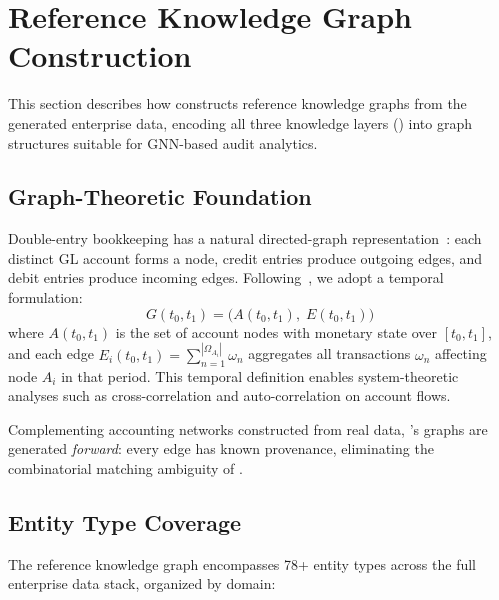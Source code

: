 \section{Reference Knowledge Graph Construction}
\label{sec:knowledge_graph}

This section describes how \system{} constructs reference knowledge
graphs from the generated enterprise data, encoding all three knowledge
layers () into graph structures suitable for
GNN-based audit analytics.

\subsection{Graph-Theoretic Foundation}
\label{sec:kg_foundation}

Double-entry bookkeeping has a natural directed-graph
representation~\citep{ijiri1965generalized}: each distinct GL account
forms a node, credit entries produce outgoing edges, and debit entries
produce incoming edges.  Following~\citet{ivertowski2024hardware}, we
adopt a temporal formulation:
\begin{equation}
G(t_0, t_1) = \bigl(A(t_0, t_1),\; E(t_0, t_1)\bigr)
\label{eq:temporal_graph}
\end{equation}
where $A(t_0,t_1)$ is the set of account nodes with monetary state over
$[t_0, t_1]$, and each edge $E_i(t_0,t_1) = \sum_{n=1}^{|\Omega_{A_i}|}
\omega_n$ aggregates all transactions $\omega_n$ affecting node $A_i$
in that period.  This temporal definition enables system-theoretic
analyses such as cross-correlation and auto-correlation on account flows.

Complementing accounting networks constructed from real data,
\system{}'s graphs are generated \emph{forward}: every edge has known provenance, eliminating the
combinatorial matching ambiguity of .

\subsection{Entity Type Coverage}
\label{sec:kg_entities}

The reference knowledge graph encompasses 78+ entity types across
the full enterprise data stack, organized by domain:

